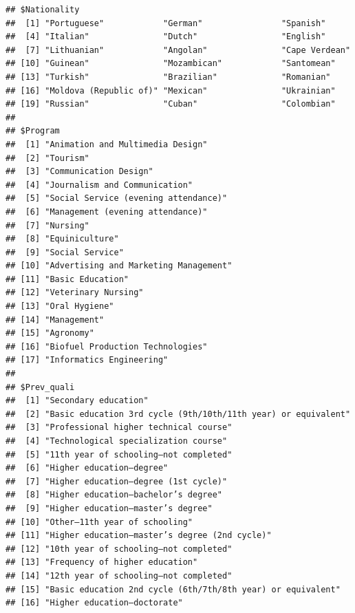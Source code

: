 \documentclass[
]{article}
\begin{document}
\begin{verbatim}
## $Nationality
##  [1] "Portuguese"            "German"                "Spanish"              
##  [4] "Italian"               "Dutch"                 "English"              
##  [7] "Lithuanian"            "Angolan"               "Cape Verdean"         
## [10] "Guinean"               "Mozambican"            "Santomean"            
## [13] "Turkish"               "Brazilian"             "Romanian"             
## [16] "Moldova (Republic of)" "Mexican"               "Ukrainian"            
## [19] "Russian"               "Cuban"                 "Colombian"            
## 
## $Program
##  [1] "Animation and Multimedia Design"     
##  [2] "Tourism"                             
##  [3] "Communication Design"                
##  [4] "Journalism and Communication"        
##  [5] "Social Service (evening attendance)" 
##  [6] "Management (evening attendance)"     
##  [7] "Nursing"                             
##  [8] "Equiniculture"                       
##  [9] "Social Service"                      
## [10] "Advertising and Marketing Management"
## [11] "Basic Education"                     
## [12] "Veterinary Nursing"                  
## [13] "Oral Hygiene"                        
## [14] "Management"                          
## [15] "Agronomy"                            
## [16] "Biofuel Production Technologies"     
## [17] "Informatics Engineering"             
## 
## $Prev_quali
##  [1] "Secondary education"                                         
##  [2] "Basic education 3rd cycle (9th/10th/11th year) or equivalent"
##  [3] "Professional higher technical course"                        
##  [4] "Technological specialization course"                         
##  [5] "11th year of schooling—not completed"                        
##  [6] "Higher education—degree"                                     
##  [7] "Higher education—degree (1st cycle)"                         
##  [8] "Higher education—bachelor’s degree"                          
##  [9] "Higher education—master’s degree"                            
## [10] "Other—11th year of schooling"                                
## [11] "Higher education—master’s degree (2nd cycle)"                
## [12] "10th year of schooling—not completed"                        
## [13] "Frequency of higher education"                               
## [14] "12th year of schooling—not completed"                        
## [15] "Basic education 2nd cycle (6th/7th/8th year) or equivalent"  
## [16] "Higher education—doctorate"                                  

\end{verbatim}
\end{document}
